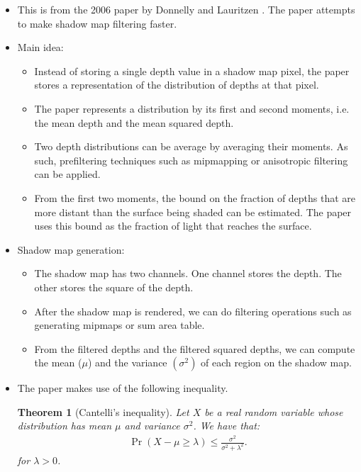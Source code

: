 \documentclass[10pt]{article}
\newtheorem{theorem}[lemma]{Theorem}
\begin{document}
  \begin{itemize}
  	\item This is from the 2006 paper by Donnelly and Lauritzen \cite{Donnelly:2006}.  The paper attempts to make shadow map filtering faster. 

  	\item Main idea:
  	\begin{itemize}
  		\item Instead of storing a single depth value in a shadow map pixel, the paper stores a representation of the distribution of depths at that pixel.  

  		\item The paper represents a distribution by its first and second moments, i.e. the mean depth and the mean squared depth.

  		\item Two depth distributions can be average by averaging their moments.  As such, prefiltering techniques such as mipmapping or anisotropic filtering can be applied.

  		\item From the first two moments, the bound on the fraction of depths that are more distant than the surface being shaded can be estimated.  The paper uses this bound as the fraction of light that reaches the surface.
  	\end{itemize}

  	\item Shadow map generation:
  	\begin{itemize}
  		\item The shadow map has two channels.  One channel stores the depth.  The other stores the square of the depth.

  		\item After the shadow map is rendered, we can do filtering operations such as generating mipmaps or sum area table.

  		\item From the filtered depths and the filtered squared depths, we can compute the mean ($\mu$) and the variance $(\sigma^2)$ of each region on the shadow map.
  	\end{itemize}

  	\item The paper makes use of the following inequality.

  	\begin{theorem}[Cantelli's inequality]
  		Let $X$ be a real random variable whose distribution has mean $\mu$ and variance $\sigma^2$.  We have that:
  		\begin{align*}
  			\Pr(X-\mu \geq \lambda) \leq \frac{\sigma^2}{\sigma^2 + \lambda^2}.
  		\end{align*}
  		for $\lambda > 0$.
  	\end{theorem}


\end{itemize}
\end{document}
